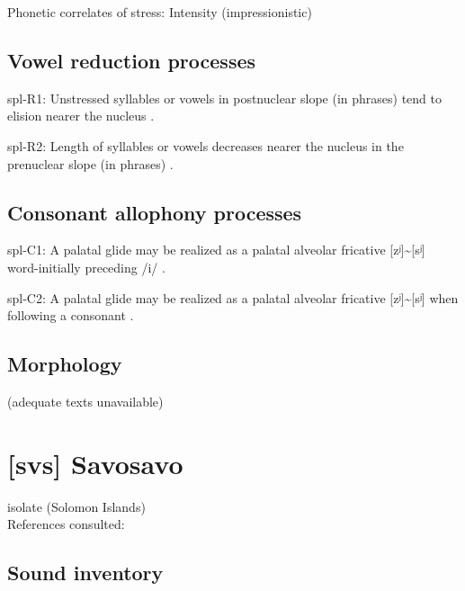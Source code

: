 {\begin{appendixdesc}
\item[Phonetic correlates of stress:] Intensity (impressionistic)
\end{appendixdesc}
\subsection*{Vowel reduction processes}
\begin{appendixdesc}

\item[spl-R1:] Unstressed syllables or vowels in postnuclear slope (in phrases) tend to elision nearer the nucleus \citep[6]{McElhanon1970}.

\item[spl-R2:] Length of syllables or vowels decreases nearer the nucleus in the prenuclear slope (in phrases) \citep[6]{McElhanon1970}.
\end{appendixdesc}
\subsection*{Consonant allophony processes}
\begin{appendixdesc}

\item[spl-C1:] A palatal glide may be realized as a palatal alveolar fricative [zʲ]{\textasciitilde}[sʲ] word-initially preceding /i/ \citep{McElhanon1970}.

\item[spl-C2:] A palatal glide may be realized as a palatal alveolar fricative [zʲ]{\textasciitilde}[sʲ] when following a consonant \citep{McElhanon1970}.
\end{appendixdesc}
\subsection*{Morphology}

(adequate texts unavailable)

\section*{[svs] Savosavo} %
isolate (Solomon Islands)\medskip\\
References consulted: \citet{Wegener2008}

\subsection*{Sound inventory}
\begin{appendixdesc}


\end{appendixdesc}}
